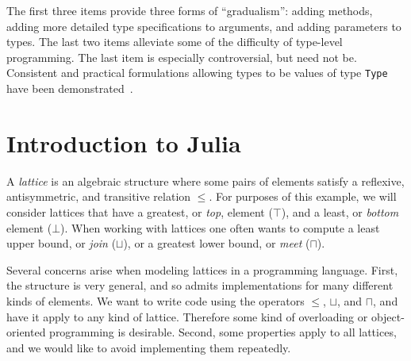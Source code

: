 \noindent
The first three items provide three forms of ``gradualism'':
adding methods, adding more detailed type specifications to arguments,
and adding parameters to types.
The last two items alleviate some of the difficulty of type-level
programming.
The last item is especially controversial, but need not be.
Consistent and practical formulations allowing types to be values of
type \texttt{Type} have been demonstrated~\cite{cardelli1986polymorphic}.






\iffalse

\section{Introduction to Julia}

A \emph{lattice} is an algebraic structure where some pairs of elements
satisfy a reflexive, antisymmetric, and transitive relation $\leq$.
For purposes of this example, we will consider lattices that have
a greatest, or \emph{top}, element ($\top$), and a least, or \emph{bottom}
element ($\bot$).
When working with lattices one often wants to compute
a least upper bound, or \emph{join} ($\sqcup$), or a greatest lower bound,
or \emph{meet} ($\sqcap$).

Several concerns arise when modeling lattices in a programming language.
First, the structure is very general, and so admits implementations
for many different kinds of elements.
We want to write code using the operators $\leq$, $\sqcup$, and $\sqcap$, and
have it apply to any kind of lattice.
Therefore some kind of overloading or object-oriented programming
is desirable.
Second, some properties apply to all lattices, and we would
like to avoid implementing them repeatedly.

